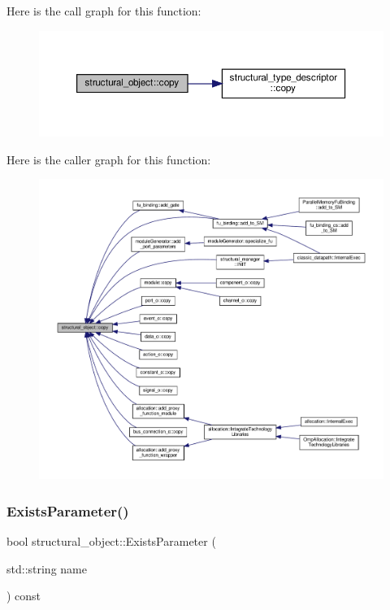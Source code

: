 Here is the call graph for this function\+:
\nopagebreak
\begin{figure}[H]
\begin{center}
\leavevmode
\includegraphics[width=350pt]{d8/da3/classstructural__object_a6566435c67934f6b4ff1b319c0682b18_cgraph}
\end{center}
\end{figure}
Here is the caller graph for this function\+:
\nopagebreak
\begin{figure}[H]
\begin{center}
\leavevmode
\includegraphics[width=350pt]{d8/da3/classstructural__object_a6566435c67934f6b4ff1b319c0682b18_icgraph}
\end{center}
\end{figure}
\mbox{\label{classstructural__object_a8576345629efc406382a716de612d276}} 
\subsubsection{\texorpdfstring{Exists\+Parameter()}{ExistsParameter()}}
{\footnotesize\ttfamily bool structural\+\_\+object\+::\+Exists\+Parameter (\begin{DoxyParamCaption}\item[{std\+::string}]{name }\end{DoxyParamCaption}) const}



